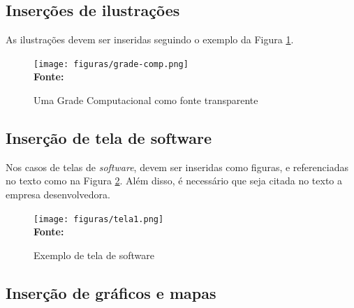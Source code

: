 \subsection{\esp Inserções de ilustrações}

As ilustrações devem ser inseridas seguindo o exemplo da Figura \ref{fig:figura1}. 
\begin{figure}[ht]
	\centering	
	\caption[\hspace{0.1cm}Grade Computacional.]{Uma Grade Computacional como fonte transparente}
	\vspace{-0.4cm}
	\texttt{[image: figuras/grade-comp.png]}
	 \vspace{-0.2cm}
	\\\textbf{\footnotesize Fonte:  }
	\label{fig:figura1}
\end{figure}
\vspace{-0.5cm}

\subsection{\esp Inserção de tela de software}

Nos casos de telas de \textit{software}, devem ser inseridas como figuras, e referenciadas no texto
como na Figura \ref{fig:tela1}. Além disso, é necessário que seja citada no texto a empresa desenvolvedora. 

\begin{figure}[!ht]
	\centering	
	\caption[\hspace{0.1cm}Exemplo de tela de software.]{Exemplo de tela de software}
	  \vspace{-0.4cm}
	\texttt{[image: figuras/tela1.png]}
	 \vspace{-0.3cm}
	\\\textbf{\footnotesize Fonte: }
	\label{fig:tela1}
\end{figure}

\newpage

\subsection{\esp Inserção de gráficos e mapas}

